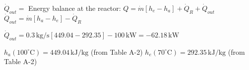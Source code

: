 \( \dot{Q}_{out} = \)  
Energy balance at the reactor:  
\( Q = \dot{m} \left[ h_e - h_a \right] + \dot{Q}_R + \dot{Q}_{out} \)  
\( \dot{Q}_{out} = \dot{m} \left[ h_a - h_e \right] - \dot{Q}_R \)  

\( \dot{Q}_{out} = 0.3 \, \text{kg/s} \left[ 449.04 - 292.35 \right] - 100 \, \text{kW} = -62.18 \, \text{kW} \)  

\( h_a (100^\circ \text{C}) = 449.04 \, \text{kJ/kg} \) (from Table A-2)  
\( h_e (70^\circ \text{C}) = 292.35 \, \text{kJ/kg} \) (from Table A-2)